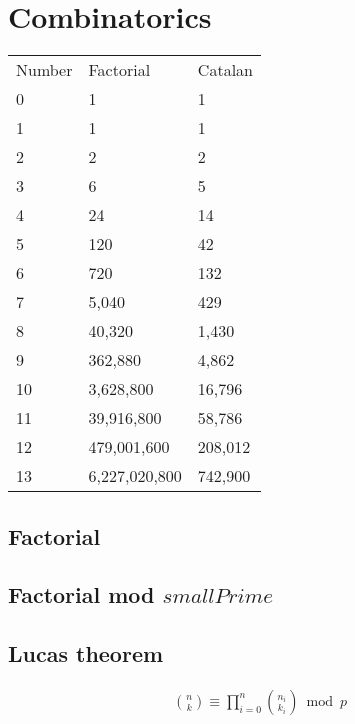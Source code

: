 \section{Combinatorics}

\begin{tabular}{ |p{1cm}|p{3cm}|p{3cm}|  }
  \hline  
  \rowcolor{Blue} 
  \multicolumn{3}{|c|}{Combinatorics table} \\ \hline
  \rowcolor{LightBlue2} 
  Number & Factorial & Catalan \\ \hline
  0 & 1 & 1 \\ \hline
  \rowcolor{Gray} 
  1 & 1 & 1 \\ \hline
  2 & 2 & 2 \\ \hline
  \rowcolor{Gray} 
  3 & 6 & 5 \\ \hline
  4 & 24 & 14 \\ \hline
  \rowcolor{Gray} 
  5 & 120 & 42 \\ \hline
  6 & 720 & 132 \\ \hline
  \rowcolor{Gray} 
  7 & 5,040 & 429 \\ \hline
  8 & 40,320 & 1,430 \\ \hline
  \rowcolor{Gray} 
  9 & 362,880 & 4,862 \\ \hline
  10 & 3,628,800 & 16,796 \\ \hline
  \rowcolor{Gray} 
  11 & 39,916,800 & 58,786 \\ \hline
  12 & 479,001,600 & 208,012 \\ \hline
  \rowcolor{Gray} 
  13 & 6,227,020,800 & 742,900 \\ \hline
\end{tabular}
\vspace{-5pt}

\subsection{Factorial} 

\subsection{Factorial mod $smallPrime$} 

\subsection{Lucas theorem}
\begin{gather*}
\binom{n}{k} \equiv \prod_{i = 0}^{n}\binom{n_i}{k_i} \bmod{p}
\end{gather*}
\vspace{-15pt}

